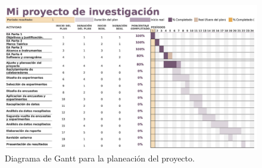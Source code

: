 \documentclass[12pt]{article}
\begin{document}
		\begin{figure}[h]
			\centering
			\includegraphics[width=\textwidth]{grant.jpg}
			\caption{Diagrama de Gantt para la planeación del proyecto.}
			\label{gantt}
		\end{figure}
		
		
\end{document}
